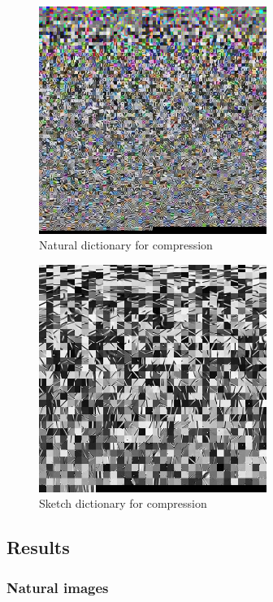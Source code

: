 \newpage
\begin{figure}[H]
\centering
\includegraphics[width = 0.66\textwidth]{images/natural_dict.jpg}
\caption{Natural dictionary for compression}\label{fig:naturalDict}
\end{figure}
\begin{figure}[H]
\centering
\includegraphics[width = 0.66\textwidth]{images/sketch_dict.jpg}
\caption{Sketch dictionary for compression}\label{fig:sketchDict}
\end{figure}


\clearpage
\subsection{Results}
\subsubsection{Natural images}

